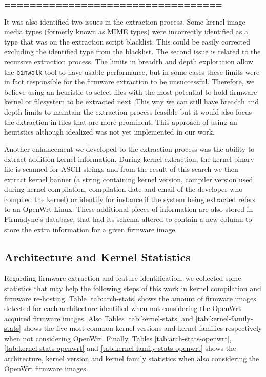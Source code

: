\textbf{==================================}

It was also identified two issues in the extraction process. Some kernel image media types (formerly known as MIME types) were incorrectly identified as a type that was on the extraction script blacklist. This could be easily corrected excluding the identified type from the blacklist. The second issue is related to the recursive extraction process. The limits in breadth and depth exploration allow the {\tt binwalk} tool to have usable performance, but in some cases these limits were in fact responsible for the firmware extraction to be unsuccessful. Therefore, we believe using an heuristic to select files with the most potential to hold firmware kernel or filesystem to be extracted next. This way we can still have breadth and depth limits to maintain the extraction process feasible but it would also focus the extraction in files that are more prominent. This approach of using an heuristics although idealized was not yet implemented in our work.

Another enhancement we developed to the extraction process was the ability to extract addition kernel information. During kernel extraction, the kernel binary file is scanned for ASCII strings and from the result of this search we then extract kernel banner (a string containing kernel version, compiler version used during kernel compilation, compilation date and email of the developer who compiled the kernel) or identify for instance if the system being extracted refers to an OpenWrt Linux. These additional pieces of information are also stored in Firmadyne's \cite{firmadyne} database, that had its schema altered to contain a new column to store the extra information for a given firmware image.


\subsection{Architecture and Kernel Statistics}

Regarding firmware extraction and feature identification, we collected some statistics that may help the following steps of this work in kernel compilation and firmware re-hosting. Table \ref{tab:arch-stats} shows the amount of firmware images detected for each architecture identified when not considering the OpenWrt acquired firmware images. Also Tables \ref{tab:kernel-stats} and \ref{tab:kernel-family-stats} shows the five most common kernel versions and kernel families respectively when not considering OpenWrt. Finally, Tables \ref{tab:arch-stats-openwrt}, \ref{tab:kernel-stats-openwrt} and \ref{tab:kernel-family-stats-openwrt} shows the architecture, kernel version and kernel family statistics when also considering the OpenWrt firmware images.

